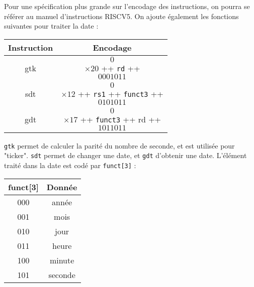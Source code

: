 \documentclass{article}
\begin{document}
Pour une spécification plus grande sur l'encodage des instructions, on pourra se référer au manuel d'instructions RISCV5. On ajoute également les fonctions suivantes pour traiter la date :

\begin{table}[h!]
\centering
\begin{tabular}{|c|c|}
\hline
\textbf{Instruction} & \textbf{Encodage} \\
\hline
gtk   & \[0\] $\times 20$ ++ \texttt{rd} ++ \[0001011\] \\
sdt   & \[0\] $\times 12$ ++ \texttt{rs1} ++ \texttt{funct3} ++ \[0101011\] \\
gdt   & \[0\] $\times 17$ ++ \texttt{funct3} ++ rd ++ \[1011011\] \\
\hline
\end{tabular}
\end{table}

\texttt{gtk} permet de calculer la parité du nombre de seconde, et est utilisée pour "ticker". \texttt{sdt} permet de changer une date, et \texttt{gdt} d'obtenir une date. L'élément traité dans la date est codé par \texttt{funct[3]} : 

\begin{table}[h!]
\centering
\begin{tabular}{|c|c|}
\hline
\textbf{funct[3]} & \textbf{Donnée} \\
\hline
000   & année \\
001  & mois \\
010  & jour \\
011  & heure \\
100  & minute \\
101  & seconde  \\
\hline
\end{tabular}
\end{table}


\end{document}
